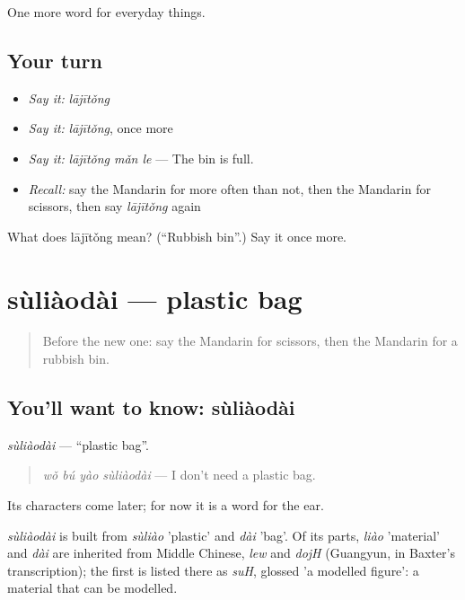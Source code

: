 \begin{grammarlens}[title={What you've built}]
One more word for everyday things.
\end{grammarlens}

\subsection*{Your turn}
\begin{itemize}
\raggedright
  \item \emph{Say it:} \emph{lājītǒng}
  \item \emph{Say it:} \emph{lājītǒng}, once more
  \item \emph{Say it:} \emph{lājītǒng mǎn le} — The bin is full.
  \item \emph{Recall:} say the Mandarin for more often than not, then the Mandarin for scissors, then say \emph{lājītǒng} again
\end{itemize}

\begin{tcolorbox}[breakable,colback=teal!4,colframe=teal!35!black,title={Before you move on}]
What does lājītǒng mean? (\textquotedblleft{}Rubbish bin\textquotedblright{}.) Say it once more.
\end{tcolorbox}
\section[sùliàodài]{sùliàodài — plastic bag}

\label{lesson:ZH-C186-suliaodai}



\begin{quote}
Before the new one: say the Mandarin for scissors, then the Mandarin for a rubbish bin.
\end{quote}

\subsection*{You'll want to know: sùliàodài}
\emph{sùliàodài} — \textquotedblleft{}plastic bag\textquotedblright{}.

\begin{quote}
\emph{wǒ bú yào sùliàodài} — I don't need a plastic bag.
\end{quote}

Its characters come later; for now it is a word for the ear.

\begin{cousinweb}
\emph{sùliàodài} is built from \emph{sùliào} 'plastic' and \emph{dài} 'bag'. Of its parts, \emph{liào} 'material' and \emph{dài} are inherited from Middle Chinese, \emph{lew} and \emph{dojH} (Guangyun, in Baxter's transcription); the first is listed there as \emph{suH}, glossed 'a modelled figure': a material that can be modelled.
\end{cousinweb}

